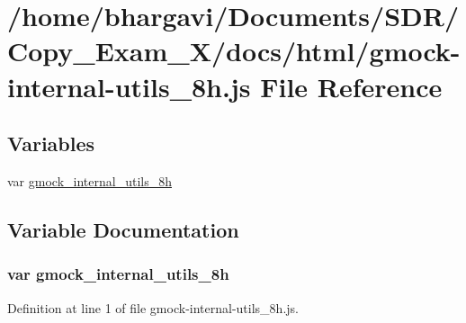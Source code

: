 \hypertarget{gmock-internal-utils__8h_8js}{}\section{/home/bhargavi/\+Documents/\+S\+D\+R/\+Copy\+\_\+\+Exam\+\_\+X/docs/html/gmock-\/internal-\/utils\+\_\+8h.js File Reference}
\label{gmock-internal-utils__8h_8js}
\subsection*{Variables}
\begin{DoxyCompactItemize}
\item 
var \hyperlink{gmock-internal-utils__8h_8js_ae0c2217de83a5bf3e44feca79e817267}{gmock\+\_\+internal\+\_\+utils\+\_\+8h}
\end{DoxyCompactItemize}


\subsection{Variable Documentation}
\subsubsection[{\texorpdfstring{gmock\+\_\+internal\+\_\+utils\+\_\+8h}{gmock_internal_utils_8h}}]{\setlength{\rightskip}{0pt plus 5cm}var gmock\+\_\+internal\+\_\+utils\+\_\+8h}\hypertarget{gmock-internal-utils__8h_8js_ae0c2217de83a5bf3e44feca79e817267}{}\label{gmock-internal-utils__8h_8js_ae0c2217de83a5bf3e44feca79e817267}


Definition at line 1 of file gmock-\/internal-\/utils\+\_\+8h.\+js.

